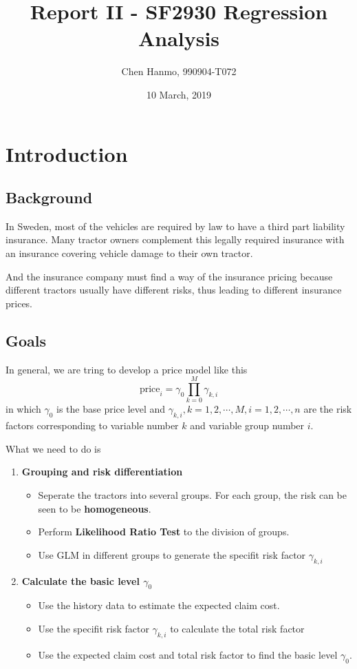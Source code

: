 \documentclass[11pt]{article}
\title{Report II - SF2930 Regression Analysis}
\author{Chen Hanmo, 990904-T072}
\date{10 March, 2019}
\begin{document}
\maketitle

\tableofcontents
\newpage


\section{Introduction}

\subsection{Background} 

In Sweden, most of the vehicles are required by law to have a third part liability insurance. Many tractor owners complement this legally required insurance with an insurance covering vehicle damage to their own tractor.

And the insurance company must find a way of the insurance pricing because different tractors usually have different risks, thus leading to different insurance prices.

\subsection{Goals}

In general, we are tring to develop a price model like this
\begin{equation}
	\text{price}_i=\gamma_0\prod_{k=0}^M \gamma_{k,i}
\end{equation} 
in which $\gamma_0$ is the base price level and $\gamma_{k,i},k=1,2,\cdots,M,i=1,2,\cdots,n$ are the risk factors corresponding to variable number $k$ and variable group number $i$. 

What we need to do is 
\begin{enumerate}
	\item {\bf Grouping and risk differentiation}
	\begin{itemize}
		\item Seperate the tractors into several groups. For each group, the risk can be seen to be {\bf homogeneous}.
		\item Perform {\bf Likelihood Ratio Test} to the division of groups.
		\item Use GLM in different groups to generate the specifit risk factor $\gamma_{k,i}$
	\end{itemize}

	\item{\bf Calculate the basic level $\gamma_0$}
	\begin{itemize}
		\item Use the history data to estimate the expected claim cost.
		\item Use the specifit risk factor $\gamma_{k,i}$ to calculate the total risk factor
		\item Use the expected claim cost and total risk factor to find the basic level $\gamma_0$.
	\end{itemize}
	
\end{enumerate}
\end{document}
